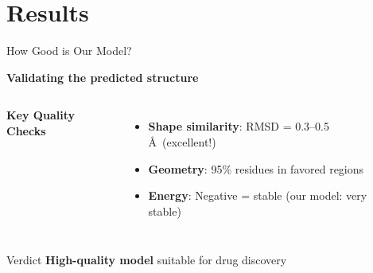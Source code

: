 \documentclass[aspectratio=169,xcolor=table]{beamer}
\begin{document}
\section{Results}
\begin{frame}{How Good is Our Model?}

\textbf{Validating the predicted structure}

\vspace{0.2cm}

\begin{columns}
\textbf{Key Quality Checks}
\begin{itemize}\setlength{\itemsep}{2pt}
    \item \textbf{Shape similarity}: RMSD = 0.3--0.5 \AA\ (excellent!)
    \item \textbf{Geometry}: 95\% residues in favored regions
    \item \textbf{Energy}: Negative = stable (our model: very stable)
\end{itemize}

\begin{center}
\end{center}
\end{columns}

\begin{block}{Verdict}
\textbf{High-quality model} suitable for drug discovery
\end{block}

\end{frame}
\end{document}
